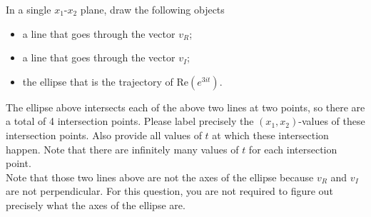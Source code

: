 \documentclass[11pt]{article}
\theoremstyle{definition}
\begin{document}
\begin{enumerate}[leftmargin=*]
\begin{itemize}
In a single $x_1$-$x_2$ plane, draw  the following objects
\begin{itemize}
\item a line that goes through the vector $v_R$;
\item a line that goes through the vector $v_I$;
\item the ellipse that is the trajectory of $\mathrm{Re}(e^{3it})$.
\end{itemize}
The ellipse above intersects each of the above two lines at two points, so there are a total of 4 intersection points.  Please label precisely the $(x_1, x_2)$-values of these intersection points.  Also provide all values of $t$ at which these intersection happen.  Note that there are infinitely many values of $t$ for each intersection point.  \\


Note that those two lines above are not the axes of the ellipse because $v_R$ and $v_I$ are not perpendicular.  For this question, you are not required to figure out precisely what the axes of the ellipse are.\\


\end{itemize}


\end{enumerate}
\end{document}
